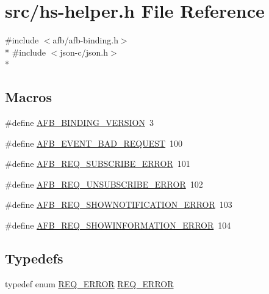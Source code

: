 \hypertarget{hs-helper_8h}{}\section{src/hs-\/helper.h File Reference}
\label{hs-helper_8h}
{\ttfamily \#include $<$afb/afb-\/binding.\+h$>$}\\*
{\ttfamily \#include $<$json-\/c/json.\+h$>$}\\*
\subsection*{Macros}
\begin{DoxyCompactItemize}
\item 
\#define \hyperlink{hs-helper_8h_ad2c1fbc92ba364fcf83f15e6d0af66f0}{A\+F\+B\+\_\+\+B\+I\+N\+D\+I\+N\+G\+\_\+\+V\+E\+R\+S\+I\+ON}~3
\item 
\#define \hyperlink{hs-helper_8h_aa611e2ec24ef295bd87825889fe2ce5e}{A\+F\+B\+\_\+\+E\+V\+E\+N\+T\+\_\+\+B\+A\+D\+\_\+\+R\+E\+Q\+U\+E\+ST}~100
\item 
\#define \hyperlink{hs-helper_8h_a995612de89db4df1483c16e4b9b70571}{A\+F\+B\+\_\+\+R\+E\+Q\+\_\+\+S\+U\+B\+S\+C\+R\+I\+B\+E\+\_\+\+E\+R\+R\+OR}~101
\item 
\#define \hyperlink{hs-helper_8h_a78e930a97920b821706a80ca8f430034}{A\+F\+B\+\_\+\+R\+E\+Q\+\_\+\+U\+N\+S\+U\+B\+S\+C\+R\+I\+B\+E\+\_\+\+E\+R\+R\+OR}~102
\item 
\#define \hyperlink{hs-helper_8h_a057fc88b8445828c261305cf9107d99d}{A\+F\+B\+\_\+\+R\+E\+Q\+\_\+\+S\+H\+O\+W\+N\+O\+T\+I\+F\+I\+C\+A\+T\+I\+O\+N\+\_\+\+E\+R\+R\+OR}~103
\item 
\#define \hyperlink{hs-helper_8h_aefe0d7ff8202f954693c235c1fb8e310}{A\+F\+B\+\_\+\+R\+E\+Q\+\_\+\+S\+H\+O\+W\+I\+N\+F\+O\+R\+M\+A\+T\+I\+O\+N\+\_\+\+E\+R\+R\+OR}~104
\end{DoxyCompactItemize}
\subsection*{Typedefs}
\begin{DoxyCompactItemize}
\item 
typedef enum \hyperlink{hs-helper_8h_aa49f1dbbf26f01627a5737cf43aad899}{R\+E\+Q\+\_\+\+E\+R\+R\+OR} \hyperlink{hs-helper_8h_ab0d62ccfa9c3ab87f090f67c3d50adce}{R\+E\+Q\+\_\+\+E\+R\+R\+OR}
\end{DoxyCompactItemize}

